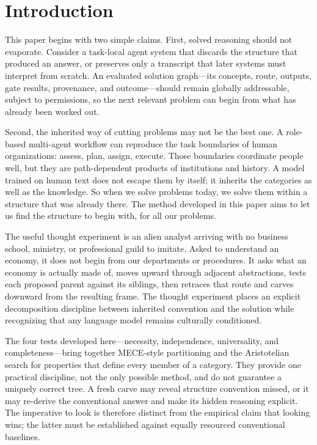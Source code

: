 \documentclass[11pt]{article}
\begin{document}
\ewfrontmatterend

\section{Introduction}

This paper begins with two simple claims. First, solved reasoning should not evaporate. Consider a task-local agent system that discards the structure that produced an answer, or preserves only a transcript that later systems must interpret from scratch. An evaluated solution graph---its concepts, route, outputs, gate results, provenance, and outcome---should remain globally addressable, subject to permissions, so the next relevant problem can begin from what has already been worked out.

Second, the inherited way of cutting problems may not be the best one. A role-based multi-agent workflow can reproduce the task boundaries of human organizations: assess, plan, assign, execute. Those boundaries coordinate people well, but they are path-dependent products of institutions and history. A model trained on human text does not escape them by itself; it inherits the categories as well as the knowledge. So when we solve problems today, we solve them within a structure that was already there. The method developed in this paper aims to let us find the structure to begin with, for all our problems.

The useful thought experiment is an alien analyst arriving with no business school, ministry, or professional guild to imitate. Asked to understand an economy, it does not begin from our departments or procedures. It asks what an economy is actually made of, moves upward through adjacent abstractions, tests each proposed parent against its siblings, then retraces that route and carves downward from the resulting frame. The thought experiment places an explicit decomposition discipline between inherited convention and the solution while recognizing that any language model remains culturally conditioned.

The four tests developed here---necessity, independence, universality, and completeness---bring together MECE-style partitioning and the Aristotelian search for properties that define every member of a category. They provide one practical discipline, not the only possible method, and do not guarantee a uniquely correct tree. A fresh carve may reveal structure convention missed, or it may re-derive the conventional answer and make its hidden reasoning explicit. The imperative to look is therefore distinct from the empirical claim that looking wins; the latter must be established against equally resourced conventional baselines.
\end{document}
